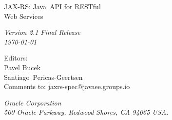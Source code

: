 \begin{titlepage}
\raggedleft

\vspace*{60pt}

{\Huge
\textsf{JAX-RS: Java\texttrademark\ API for RESTful\\\vspace{10pt}
 Web Services}}

\vspace{20pt}

{
\Large\textit{Version 2.1 Final Release\\
\today}
}

\vspace{40pt}

{\large Editors:\\
Pavel Bucek\\
Santiago\ Pericas-Geertsen\\
\vspace{10pt}Comments to: jaxrs-spec@javaee.groups.io
}

\vspace{80pt}

{\small\textit{Oracle Corporation\\
500 Oracle Parkway, Redwood Shores, CA 94065 USA.}
}
\end{titlepage} 
